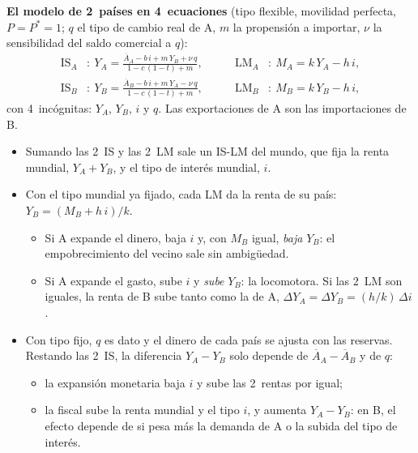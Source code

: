 \documentclass[11pt]{article}
\begin{document}
\begin{anotaciones}
\textbf{El modelo de 2~países en 4~ecuaciones} (tipo flexible, movilidad perfecta, $P=P^*=1$; $q$ el tipo de cambio real de A, $m$ la propensión a importar, $\nu$ la sensibilidad del saldo comercial a $q$):
\[
\begin{aligned}
\text{IS}_A&:\ Y_A=\frac{\overline{A}_A-b\,i+m\,Y_B+\nu\,q}{1-c\,(1-t)+m}, &\qquad \text{LM}_A&:\ M_A=k\,Y_A-h\,i,\\
\text{IS}_B&:\ Y_B=\frac{\overline{A}_B-b\,i+m\,Y_A-\nu\,q}{1-c\,(1-t)+m}, &\qquad \text{LM}_B&:\ M_B=k\,Y_B-h\,i,
\end{aligned}
\]
con 4~incógnitas: $Y_A$, $Y_B$, $i$ y $q$. Las exportaciones de A son las importaciones de B.
\begin{itemize}
\item Sumando las 2~IS y las 2~LM sale un IS-LM del mundo, que fija la renta mundial, $Y_A+Y_B$, y el tipo de interés mundial, $i$.
\item Con el tipo mundial ya fijado, cada LM da la renta de su país: $Y_B=(M_B+h\,i)/k$.
  \begin{itemize}
  \item Si A expande el dinero, baja $i$ y, con $M_B$ igual, \emph{baja} $Y_B$: el empobrecimiento del vecino sale sin ambigüedad.
  \item Si A expande el gasto, sube $i$ y \emph{sube} $Y_B$: la locomotora. Si las 2~LM son iguales, la renta de B sube tanto como la de A, $\Delta Y_A=\Delta Y_B=(h/k)\,\Delta i$.
  \end{itemize}
\item Con tipo fijo, $q$ es dato y el dinero de cada país se ajusta con las reservas. Restando las 2~IS, la diferencia $Y_A-Y_B$ solo depende de $\overline{A}_A-\overline{A}_B$ y de $q$:
  \begin{itemize}
  \item la expansión monetaria baja $i$ y sube las 2~rentas por igual;
  \item la fiscal sube la renta mundial y el tipo $i$, y aumenta $Y_A-Y_B$: en B, el efecto depende de si pesa más la demanda de A o la subida del tipo de interés.
  \end{itemize}
\end{itemize}
\end{anotaciones}
\end{document}

